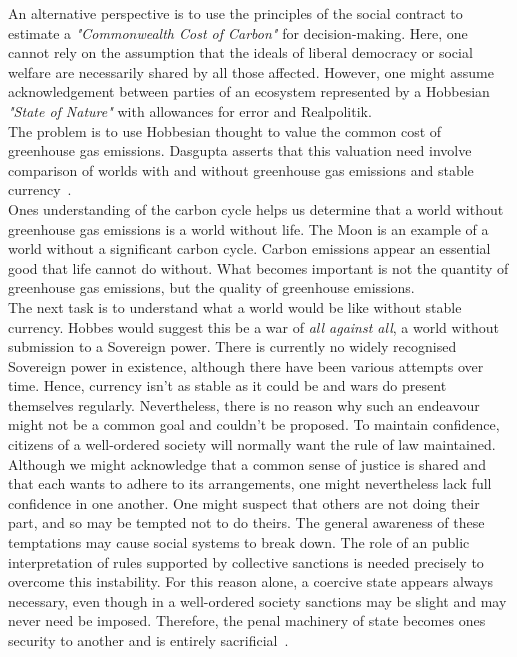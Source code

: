 \documentclass[11pt, oneside]{article}   	%
\begin{document}
An alternative perspective is to use the principles of the social contract to estimate a \emph{"Commonwealth Cost of Carbon"} for decision-making.
Here, one cannot rely on the assumption that the ideals of liberal democracy or social welfare are necessarily shared by all those affected.
However, one might assume acknowledgement between parties of an ecosystem represented by a Hobbesian \emph{"State of Nature"} with allowances for error and Realpolitik.\\
The problem is to use Hobbesian thought to value the common cost of greenhouse gas emissions.
Dasgupta asserts that this valuation need involve comparison of worlds with and without greenhouse gas emissions and stable currency~\cite{pd2}.\\

Ones understanding of the carbon cycle helps us determine that a world without greenhouse gas emissions is a world without life.
The Moon is an example of a world without a significant carbon cycle.
Carbon emissions appear an essential good that life cannot do without.
What becomes important is not the quantity of greenhouse gas emissions, but the quality of greenhouse emissions.\\

The next task is to understand what a world would be like without stable currency.
Hobbes would suggest this be a war of \emph{all against all}, a world without submission to a Sovereign power.
There is currently no widely recognised Sovereign power in existence, although there have been various attempts over time.
Hence, currency isn't as stable as it could be and wars do present themselves regularly.
Nevertheless, there is no reason why such an endeavour might not be a common goal and couldn't be proposed.
To maintain confidence, citizens of a well-ordered society will normally want the rule of law maintained.
Although we might acknowledge that a common sense of justice is shared and that each wants to adhere to its arrangements, one might nevertheless lack full confidence in one another.
One might suspect that others are not doing their part, and so may be tempted not to do theirs.
The general awareness of these temptations may cause social systems to break down.
The role of an public interpretation of rules supported by collective sanctions is needed precisely to overcome this instability.
For this reason alone, a coercive state appears always necessary, even though in a well-ordered society sanctions may be slight and may never need be imposed.
Therefore, the penal machinery of state becomes ones security to another and is entirely sacrificial~\cite{jr1}.\\
\end{document}
